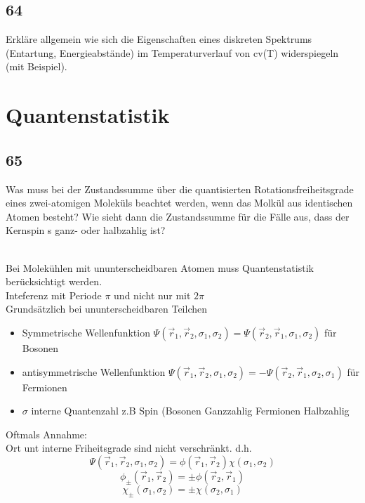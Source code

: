 \subsection{64}
\begin{myfrag}
Erkläre allgemein wie sich die Eigenschaften eines diskreten Spektrums
(Entartung, Energieabstände) im Temperaturverlauf von cv(T) widerspiegeln
(mit Beispiel).
\end{myfrag}
\section{Quantenstatistik}
\subsection{65}
\begin{myfrag}
Was muss bei der Zustandssumme über die quantisierten
Rotationsfreiheitsgrade eines zwei-atomigen Moleküls beachtet werden, wenn
das Molkül aus identischen Atomen besteht? Wie sieht dann die
Zustandssumme für die Fälle aus, dass der Kernspin s ganz- oder halbzahlig
ist?
\end{myfrag} \quad \\
Bei Molekühlen mit ununterscheidbaren Atomen muss Quantenstatistik berücksichtigt werden. \\
Inteferenz mit Periode $\pi $ und nicht nur mit $ 2 \pi $ \\[1.5ex]
Grundsätzlich bei ununterscheidbaren Teilchen 
\\
\begin{itemize}
\item Symmetrische Wellenfunktion $ \Psi (\vec{r} _1 , \vec{r}_2 , \sigma _1 , \sigma _2 ) = \Psi (\vec{r} _2 , \vec{r}_1 , \sigma _1 , \sigma _2 ) $ für Bosonen
\item antisymmetrische Wellenfunktion $\Psi (\vec{r} _1 , \vec{r}_2 , \sigma _1 , \sigma _2 ) = - \Psi (\vec{r} _2 , \vec{r}_1 , \sigma _2 , \sigma _1 )$ für Fermionen
\item $\sigma $ \glqq interne \grqq Quantenzahl z.B Spin (Bosonen Ganzzahlig Fermionen Halbzahlig
\end{itemize}
Oftmals Annahme: \\[1.5ex] 
Ort unt interne Friheitsgrade sind nicht verschränkt.
d.h. $$\Psi (\vec{r} _1 , \vec{r}_2 , \sigma _1 , \sigma _2 ) = \phi (\vec{r} _1 , \vec{r}_2) \chi ( \sigma _1 , \sigma _2 )$$
$$ \phi _\pm (\vec{r} _1 , \vec{r}_2) = \pm \phi (\vec{r} _2 , \vec{r}_1)$$
$$\chi_\pm ( \sigma _1 , \sigma _2 ) = \pm \chi ( \sigma _2 , \sigma _1 )$$
